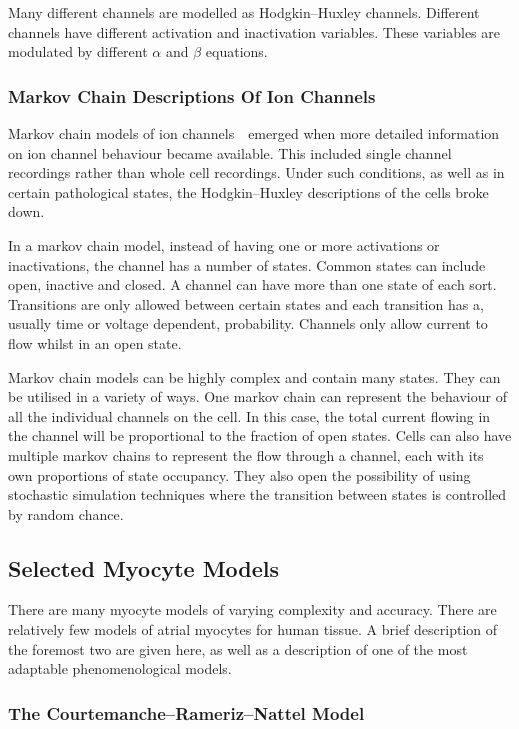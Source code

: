 Many different channels are modelled as Hodgkin--Huxley channels.
Different channels have different activation and inactivation variables.
These variables are modulated by different $\alpha$ and $\beta$ equations.

\subsubsection{Markov Chain Descriptions Of Ion Channels}

Markov chain models of ion channels~\cite{Balser1990,Clancy1999,Silva2005}\
emerged when more detailed information on ion channel behaviour became
available.
This included single channel recordings rather than whole cell recordings.
Under such conditions, as well as in certain pathological states, the
Hodgkin--Huxley descriptions of the cells broke down.

In a markov chain model, instead of having one or more activations or
inactivations, the channel has a number of states.
Common states can include open, inactive and closed.
A channel can have more than one state of each sort.
Transitions are only allowed between certain states and each transition has a,
usually time or voltage dependent, probability.
Channels only allow current to flow whilst in an open state.

Markov chain models can be highly complex and contain many states.
They can be utilised in a variety of ways.
One markov chain can represent the behaviour of all the individual channels on
the cell.
In this case, the total current flowing in the channel will be proportional to
the fraction of open states.
Cells can also have multiple markov chains to represent the flow through a
channel, each with its own proportions of state occupancy.
They also open the possibility of using stochastic simulation techniques where
the transition between states is controlled by random chance.

\subsection{Selected Myocyte Models}

There are many myocyte models of varying complexity and
accuracy.
There are relatively few models of atrial myocytes for human tissue.
A brief description of the foremost two are given here, as well as a description
of one of the most adaptable phenomenological models.

\subsubsection{The Courtemanche--Rameriz--Nattel Model}
\label{sec:intro:math:crn}

